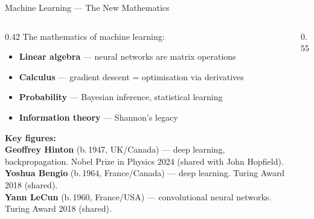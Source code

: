\begin{frame}[shrink=25]{Machine Learning --- The New Mathematics}

  \begin{columns}[T]
    \begin{column}{0.42\textwidth}
      {\small The mathematics of machine learning:}

      \vspace{0.3em}
      \begin{tcolorbox}[colback=aiViolet!5, colframe=aiViolet, rounded corners,
        boxrule=0.7pt, left=3pt, right=3pt, top=2pt, bottom=2pt, fonttitle=\bfseries\small,
        title={Math Inside Every AI}]
        \small
        \begin{itemize}\setlength\itemsep{2pt}
          \item \textbf{Linear algebra} --- neural networks are matrix operations
          \item \textbf{Calculus} --- gradient descent = optimisation via derivatives
          \item \textbf{Probability} --- Bayesian inference, statistical learning
          \item \textbf{Information theory} --- Shannon's legacy
        \end{itemize}
      \end{tcolorbox}

      \vspace{0.3em}
      {\scriptsize\textbf{Key figures:}\\
      \textbf{Geoffrey Hinton} (b.\,1947, UK/Canada) --- deep learning, backpropagation.
      Nobel Prize in Physics 2024 (shared with John Hopfield).\\[2pt]
      \textbf{Yoshua Bengio} (b.\,1964, France/Canada) --- deep learning.
      Turing Award 2018 (shared).\\[2pt]
      \textbf{Yann LeCun} (b.\,1960, France/USA) --- convolutional neural
      networks. Turing Award 2018 (shared).}
    \end{column}

    \begin{column}{0.55\textwidth}
    \end{column}
  \end{columns}


\end{frame}
